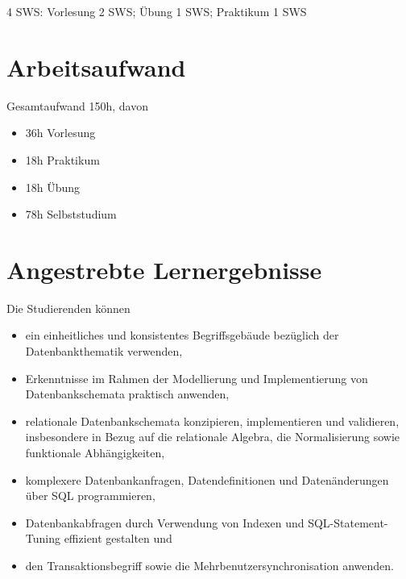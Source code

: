 4 SWS: Vorlesung 2 SWS; Übung 1 SWS; Praktikum 1 SWS

\hypertarget{arbeitsaufwandpathlabel....srcmodulbeschreibungen-bachelor-bpo5ba_datenbanksysteme}{%
\section*{Arbeitsaufwand\label{../../src/modulbeschreibungen-bachelor-bpo5/BA_Datenbanksysteme}}\label{arbeitsaufwandpathlabel....srcmodulbeschreibungen-bachelor-bpo5ba_datenbanksysteme}}

Gesamtaufwand 150h, davon

\begin{itemize}
\tightlist
\item
  36h Vorlesung
\item
  18h Praktikum
\item
  18h Übung
\item
  78h Selbststudium
\end{itemize}

\hypertarget{angestrebte-lernergebnissepathlabel....srcmodulbeschreibungen-bachelor-bpo5ba_datenbanksysteme}{%
\section*{Angestrebte
Lernergebnisse\label{../../src/modulbeschreibungen-bachelor-bpo5/BA_Datenbanksysteme}}\label{angestrebte-lernergebnissepathlabel....srcmodulbeschreibungen-bachelor-bpo5ba_datenbanksysteme}}

Die Studierenden können

\begin{itemize}
\tightlist
\item
  ein einheitliches und konsistentes Begriffsgebäude bezüglich der
  Datenbankthematik verwenden,
\item
  Erkenntnisse im Rahmen der Modellierung und Implementierung von
  Datenbankschemata praktisch anwenden,
\item
  relationale Datenbankschemata konzipieren, implementieren und
  validieren, insbesondere in Bezug auf die relationale Algebra, die
  Normalisierung sowie funktionale Abhängigkeiten,
\item
  komplexere Datenbankanfragen, Datendefinitionen und Datenänderungen
  über SQL programmieren,~
\item
  Datenbankabfragen durch Verwendung von Indexen und
  SQL-Statement-Tuning effizient gestalten und
\item
  den Transaktionsbegriff sowie die Mehrbenutzersynchronisation
  anwenden.
\end{itemize}

